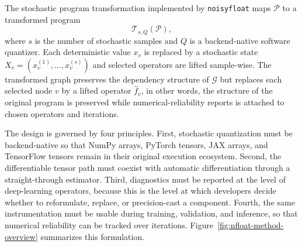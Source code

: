 \documentclass[manuscript, screen]{acmart}
\begin{document}
The stochastic program transformation implemented by \texttt{noisyfloat} maps $\mathcal{P}$ to a transformed program
\begin{equation}
\mathcal{T}_{s,Q}(\mathcal{P}),
\end{equation}
where $s$ is the number of stochastic samples and $Q$ is a backend-native software quantizer. Each deterministic value $x_v$ is replaced by a stochastic state $X_v=(x_v^{(1)},\ldots,x_v^{(s)})$ and selected operators are lifted sample-wise. The transformed graph preserves the dependency structure of $\mathcal{G}$ but replaces each selected node $v$ by a lifted operator $\widehat{f}_v$, in other words, 
the structure of the original program is preserved while numerical-reliability 
reports is attached to chosen operators and iterations.



The design is governed by four principles. First, stochastic
quantization must be backend-native so that NumPy arrays, PyTorch tensors, JAX
arrays, and TensorFlow tensors remain in their original execution ecosystem.
Second, the differentiable tensor path must coexist with automatic
differentiation through a straight-through estimator. Third, diagnostics must
be reported at the level of deep-learning operators, because this is the level
at which developers decide whether to reformulate, replace, or precision-cast a
component. Fourth, the same instrumentation must be usable during training,
validation, and inference, so that numerical reliability can be tracked over
iterations. Figure~\ref{fig:nfloat-method-overview} summarizes this formulation.
\end{document}
